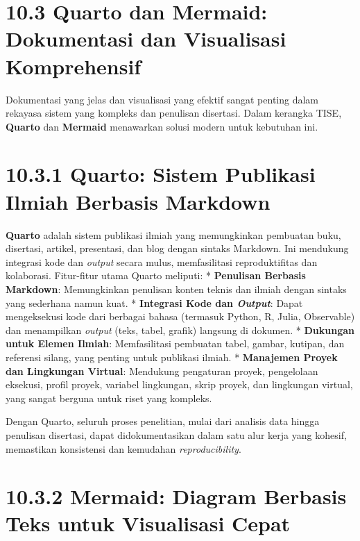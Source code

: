 \documentclass[
  letterpaper,
  DIV=11,
  numbers=noendperiod]{scrreprt}
\begin{document}
\section{\texorpdfstring{\textbf{10.3 Quarto dan Mermaid: Dokumentasi
dan Visualisasi
Komprehensif}}{10.3 Quarto dan Mermaid: Dokumentasi dan Visualisasi Komprehensif}}\label{quarto-dan-mermaid-dokumentasi-dan-visualisasi-komprehensif}

Dokumentasi yang jelas dan visualisasi yang efektif sangat penting dalam
rekayasa sistem yang kompleks dan penulisan disertasi. Dalam kerangka
TISE, \textbf{Quarto} dan \textbf{Mermaid} menawarkan solusi modern
untuk kebutuhan ini.

\section{\texorpdfstring{\textbf{10.3.1 Quarto: Sistem Publikasi Ilmiah
Berbasis
Markdown}}{10.3.1 Quarto: Sistem Publikasi Ilmiah Berbasis Markdown}}\label{quarto-sistem-publikasi-ilmiah-berbasis-markdown}

\textbf{Quarto} adalah sistem publikasi ilmiah yang memungkinkan
pembuatan buku, disertasi, artikel, presentasi, dan blog dengan sintaks
Markdown. Ini mendukung integrasi kode dan \emph{output} secara mulus,
memfasilitasi reproduktifitas dan kolaborasi. Fitur-fitur utama Quarto
meliputi: * \textbf{Penulisan Berbasis Markdown}: Memungkinkan penulisan
konten teknis dan ilmiah dengan sintaks yang sederhana namun kuat. *
\textbf{Integrasi Kode dan \emph{Output}}: Dapat mengeksekusi kode dari
berbagai bahasa (termasuk Python, R, Julia, Observable) dan menampilkan
\emph{output} (teks, tabel, grafik) langsung di dokumen. *
\textbf{Dukungan untuk Elemen Ilmiah}: Memfasilitasi pembuatan tabel,
gambar, kutipan, dan referensi silang, yang penting untuk publikasi
ilmiah. * \textbf{Manajemen Proyek dan Lingkungan Virtual}: Mendukung
pengaturan proyek, pengelolaan eksekusi, profil proyek, variabel
lingkungan, skrip proyek, dan lingkungan virtual, yang sangat berguna
untuk riset yang kompleks.

Dengan Quarto, seluruh proses penelitian, mulai dari analisis data
hingga penulisan disertasi, dapat didokumentasikan dalam satu alur kerja
yang kohesif, memastikan konsistensi dan kemudahan
\emph{reproducibility}.

\section{\texorpdfstring{\textbf{10.3.2 Mermaid: Diagram Berbasis Teks
untuk Visualisasi
Cepat}}{10.3.2 Mermaid: Diagram Berbasis Teks untuk Visualisasi Cepat}}\label{mermaid-diagram-berbasis-teks-untuk-visualisasi-cepat}
\end{document}

